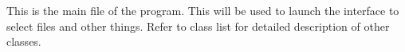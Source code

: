 This is the main file of the program. This will be used to launch the interface to select files and other things. Refer to class list for detailed description of other classes. 